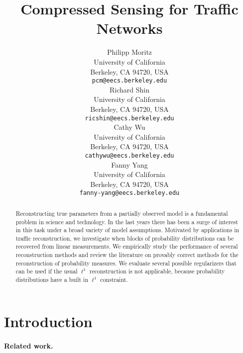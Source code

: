 \documentclass{article} %
\begin{document}
\title{Compressed Sensing for Traffic Networks}

\author{
Philipp Moritz\\
University of California\\
Berkeley, CA 94720, USA\\
\texttt{pcm@eecs.berkeley.edu}\\
\And
Richard Shin\\
University of California\\
Berkeley, CA 94720, USA\\
\texttt{ricshin@eecs.berkeley.edu}\\
\And
Cathy Wu\\
University of California\\
Berkeley, CA 94720, USA\\
\texttt{cathywu@eecs.berkeley.edu}\\
\And
Fanny Yang\\
University of California\\
Berkeley, CA 94720, USA\\
\texttt{fanny-yang@eecs.berkeley.edu} \\
}

\maketitle

\begin{abstract}
Reconstructing true parameters from a partially observed model is a fundamental problem in science and technology.
In the last years there has been a surge of interest in this task under a broad variety of model assumptions.
Motivated by applications in traffic reconstruction, we investigate when blocks of probability distributions can be recovered from linear measurements.
We empirically study the performance of several reconstruction methods and review the literature on provably correct methods for the reconstruction of probability measures.
We evaluate several possible regularizers that can be used if the usual $\ell^1$ reconstruction is not applicable, because probability distributions have a built in $\ell^1$ constraint.
\end{abstract}

\section{Introduction}
\paragraph{Related work.}
\end{document}
